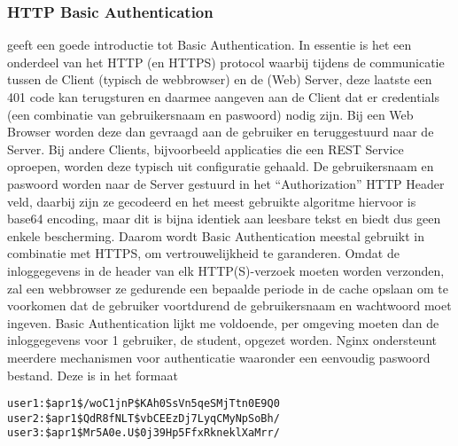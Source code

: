 \subsubsection{HTTP Basic Authentication}
\textcite{Mozilla2023} geeft een goede introductie tot Basic Authentication.
In essentie is het een onderdeel van het HTTP (en HTTPS) protocol waarbij tijdens de communicatie tussen de Client (typisch de webbrowser) en de (Web) Server, deze laatste een 401 code kan terugsturen en daarmee aangeven aan de Client dat er credentials (een combinatie van gebruikersnaam en paswoord) nodig zijn. Bij een Web Browser worden deze dan gevraagd aan de gebruiker en teruggestuurd naar de Server. Bij andere Clients, bijvoorbeeld applicaties die een REST Service oproepen, worden deze typisch uit configuratie gehaald.
De gebruikersnaam en paswoord worden naar de Server gestuurd in het ``Authorization'' HTTP Header veld, daarbij zijn ze gecodeerd en het meest gebruikte algoritme hiervoor is base64 encoding, maar dit is bijna identiek aan leesbare tekst en biedt dus geen enkele bescherming. Daarom wordt Basic Authentication meestal gebruikt in combinatie met HTTPS, om vertrouwelijkheid te garanderen.
\newline
Omdat de inloggegevens in de header van elk HTTP(S)-verzoek moeten worden verzonden, zal een webbrowser ze gedurende een bepaalde periode in de cache opslaan om te voorkomen dat de gebruiker voortdurend de gebruikersnaam en wachtwoord moet ingeven.
\newline
\newline
Basic Authentication lijkt me voldoende, per omgeving moeten dan de inloggegevens voor 1 gebruiker, de student, opgezet worden. Nginx ondersteunt meerdere mechanismen voor authenticatie waaronder een eenvoudig paswoord bestand. Deze is in het formaat
\newline
\newline
\begin{lstlisting}
user1:$apr1$/woC1jnP$KAh0SsVn5qeSMjTtn0E9Q0
user2:$apr1$QdR8fNLT$vbCEEzDj7LyqCMyNpSoBh/
user3:$apr1$Mr5A0e.U$0j39Hp5FfxRkneklXaMrr/ 
\end{lstlisting}


